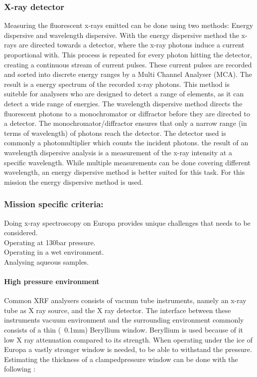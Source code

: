 \subsubsection{X-ray detector}
Measuring the fluorescent x-rays emitted can be done using two methods: Energy dispersive and wavelength dispersive. 
With the energy dispersive method the x-rays are directed towards a detector, where the x-ray photons induce a current proportional with. This process is repeated for every photon hitting the detector, creating a continuous stream of current pulses. These current pulses are recorded and sorted into discrete energy ranges by a Multi Channel Analyser (MCA). The result is a energy spectrum of the recorded x-ray photons. This method is suiteble for analysers who are designed to detect a range of elements, as it can detect a wide range of energies.
The wavelength dispersive method directs the fluorescent photons to a monochromator or diffractor before they are directed to a detector. The monochromator/diffractor ensures that only a narrow range (in terms of wavelength) of photons reach the detector. The detector used is commonly a photomultiplier which counts the incident photons. the result of an wavelength dispersive analysis is a measurement of the x-ray intensity at a specific wavelength. While multiple measurements can be done covering different wavelength, an energy dispersive method is better suited for this task.
For this mission the energy dispersive method is used.

\subsubsection{Mission specific criteria:}
Doing x-ray spectroscopy on Europa provides unique challenges that needs to be considered.\\
Operating at 130bar pressure.\\
Operating in a wet environment.\\
Analysing aqueous samples.\\

\paragraph{High pressure environment}
Common XRF analysers consists of vacuum tube instruments, namely an  x-ray tube as X ray source, and the X ray detector. The interface between these instruments vacuum environment and the surrounding environment commonly consists of a thin (~0.1mm) Beryllium window. Beryllium is used because of it low X ray attenuation compared to its strength. When operating under the ice of Europa a vastly stronger window is needed, to be able to withstand the pressure.
Estimating the thickness of a clampedpressure window can be done with the following \citep{High_pressure_window}: 

